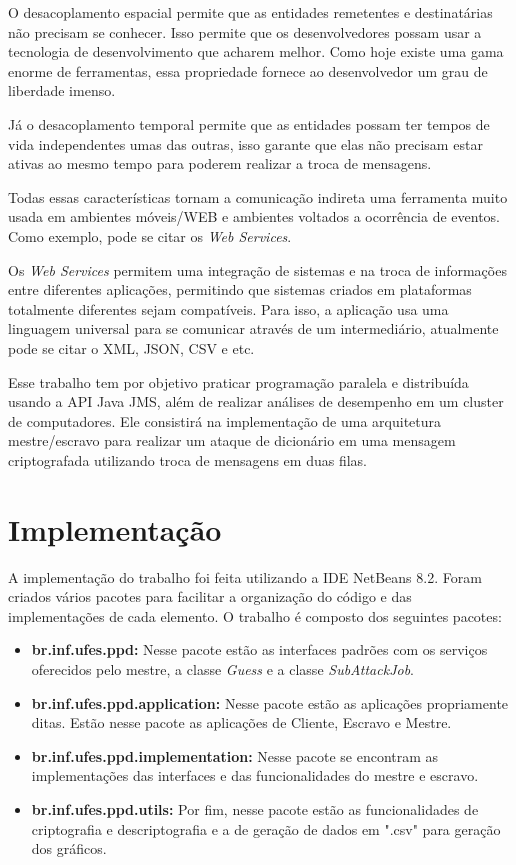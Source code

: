 \documentclass[
	12pt,				%
    oneside,			%
	a4paper,			%
	english,			%
	brazil,				%
	]{abntex2}
\begin{document}
O desacoplamento espacial permite que as entidades remetentes e destinatárias não precisam se conhecer. Isso permite que os desenvolvedores possam usar a tecnologia de desenvolvimento que acharem melhor. Como hoje existe uma gama enorme de ferramentas, essa propriedade fornece ao desenvolvedor um grau de liberdade imenso.

Já o desacoplamento temporal permite que as entidades possam ter tempos de vida independentes umas das outras, isso garante que elas não precisam estar ativas ao mesmo tempo para poderem realizar a troca de mensagens.

Todas essas características tornam a comunicação indireta uma ferramenta muito usada em ambientes móveis/WEB e ambientes voltados a ocorrência de eventos. Como exemplo, pode se citar os \textit{Web Services}.

Os \textit{Web Services} permitem uma integração de sistemas e na troca de informações entre diferentes aplicações, permitindo que sistemas criados em plataformas totalmente diferentes sejam compatíveis. Para isso, a aplicação usa uma linguagem universal para se comunicar através de um intermediário, atualmente pode se citar o XML, JSON, CSV e etc.

Esse trabalho tem por objetivo praticar programação paralela e distribuída usando a API Java JMS, além de 
realizar análises de desempenho em um cluster de computadores. 
Ele consistirá na implementação de uma arquitetura mestre/escravo para realizar um ataque de dicionário em uma mensagem criptografada utilizando troca de mensagens em duas filas.


\chapter{Implementação} 
A implementação do trabalho foi feita utilizando a IDE NetBeans 8.2. Foram criados vários pacotes para facilitar a organização 
do código e das implementações de cada elemento. O trabalho é composto dos seguintes pacotes:

\begin{itemize}

	\item \textbf{br.inf.ufes.ppd:} Nesse pacote estão as interfaces padrões com os serviços oferecidos pelo mestre,
	a classe \textit{Guess} e a classe \textit{SubAttackJob}.
	
	\item \textbf{br.inf.ufes.ppd.application:} Nesse pacote estão as aplicações propriamente ditas. Estão nesse pacote as
	aplicações de Cliente, Escravo e Mestre.

	\item \textbf{br.inf.ufes.ppd.implementation:} Nesse pacote se encontram as implementações das interfaces e das 
	funcionalidades do mestre e escravo. 
	
	\item \textbf{br.inf.ufes.ppd.utils:} Por fim, nesse pacote estão as funcionalidades de criptografia e descriptografia e 
	a de geração de dados em ".csv" para geração dos gráficos.
		

\end{itemize}
\end{document}
